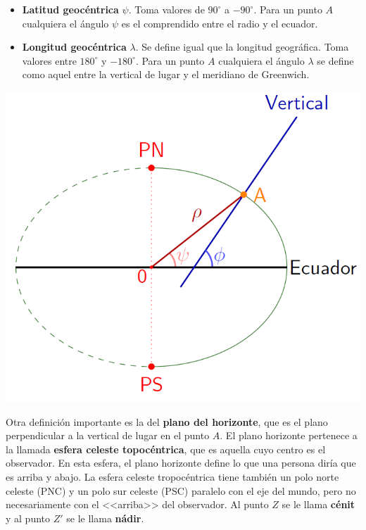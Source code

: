 \begin{itemize}
	\begin{minipage}{.5\textwidth}
	\begin{itemize}
		\item \textbf{Latitud geocéntrica} $\psi$. Toma valores de $90^\circ$ a $-90^\circ$. Para un punto $A$ cualquiera el ángulo $\psi$ es el comprendido entre el radio y el ecuador. 
		\item \textbf{Longitud geocéntrica} $\lambda$. Se define igual que la longitud geográfica. Toma valores entre $180^\circ$ y $-180^\circ$. Para un punto $A$ cualquiera el ángulo $\lambda$ se define como aquel entre la vertical de lugar y el meridiano de Greenwich.
	\end{itemize}
	\end{minipage}	\hfill
	\begin{minipage}{0.5\textwidth} \centering
		\includegraphics[scale=0.42]{Cuerpo/Imagenes/01_Coordenadas.png} 
	\end{minipage}	
	
\end{itemize}

Otra definición importante es la del \textbf{plano del horizonte}, que es el plano perpendicular a la vertical de lugar en el punto $A$. El plano horizonte pertenece a la llamada \textbf{esfera celeste topocéntrica}, que es aquella cuyo centro es el observador. En esta esfera, el plano horizonte define lo que una persona diría que es arriba y abajo. La esfera celeste tropocéntrica tiene también un polo norte celeste (PNC) y un polo sur celeste (PSC) paralelo con el eje del mundo, pero no necesariamente con el <<arriba>> del observador. Al punto $Z$ se le llama \textbf{cénit} y al punto $Z'$ se le llama \textbf{nádir}.

